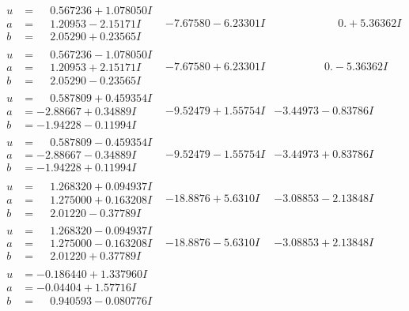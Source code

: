 \documentclass[1p]{elsarticle_modified}
\theoremstyle{definition}
\begin{document}
$$\begin{array}{c|c|c}
\begin{aligned}
u &= \phantom{-}0.567236 + 1.078050 I \\
a &= \phantom{-}1.20953 - 2.15171 I \\
b &= \phantom{-}2.05290 + 0.23565 I\end{aligned}
 & -7.67580 - 6.23301 I & \phantom{-0.000000 -}0. + 5.36362 I \\ \hline\begin{aligned}
u &= \phantom{-}0.567236 - 1.078050 I \\
a &= \phantom{-}1.20953 + 2.15171 I \\
b &= \phantom{-}2.05290 - 0.23565 I\end{aligned}
 & -7.67580 + 6.23301 I & \phantom{-0.000000 } 0. - 5.36362 I \\ \hline\begin{aligned}
u &= \phantom{-}0.587809 + 0.459354 I \\
a &= -2.88667 + 0.34889 I \\
b &= -1.94228 - 0.11994 I\end{aligned}
 & -9.52479 + 1.55754 I & -3.44973 - 0.83786 I \\ \hline\begin{aligned}
u &= \phantom{-}0.587809 - 0.459354 I \\
a &= -2.88667 - 0.34889 I \\
b &= -1.94228 + 0.11994 I\end{aligned}
 & -9.52479 - 1.55754 I & -3.44973 + 0.83786 I \\ \hline\begin{aligned}
u &= \phantom{-}1.268320 + 0.094937 I \\
a &= \phantom{-}1.275000 + 0.163208 I \\
b &= \phantom{-}2.01220 - 0.37789 I\end{aligned}
 & -18.8876 + 5.6310 I & -3.08853 - 2.13848 I \\ \hline\begin{aligned}
u &= \phantom{-}1.268320 - 0.094937 I \\
a &= \phantom{-}1.275000 - 0.163208 I \\
b &= \phantom{-}2.01220 + 0.37789 I\end{aligned}
 & -18.8876 - 5.6310 I & -3.08853 + 2.13848 I \\ \hline\begin{aligned}
u &= -0.186440 + 1.337960 I \\
a &= -0.04404 + 1.57716 I \\
b &= \phantom{-}0.940593 - 0.080776 I\end{aligned}

\end{array}$$
\end{document}
